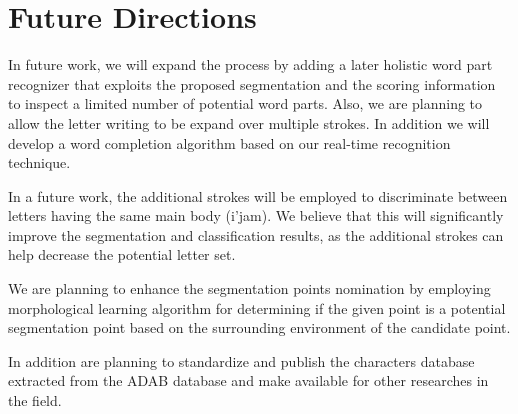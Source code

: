 \newpage{}

\section{Future Directions}
\label{sec:future_directions}

In future work, we will expand the process by adding a later holistic word part recognizer that exploits the proposed segmentation and the scoring information to inspect a limited number of potential word parts.
Also, we are planning to allow the letter writing to be expand over multiple strokes.
In addition we will develop a word completion algorithm based on our real-time recognition technique.

In a future work, the additional strokes will be employed to discriminate between letters having the same main body (i'jam).
We believe that this will significantly improve the segmentation and classification results, as the additional strokes can help decrease the potential letter set.

We are planning to enhance the segmentation points nomination by employing morphological learning algorithm for determining if the given point is a potential segmentation point based on the surrounding environment of the candidate point. 

In addition are planning to standardize and publish the characters database extracted from the ADAB database and make available for other researches in the field.

%